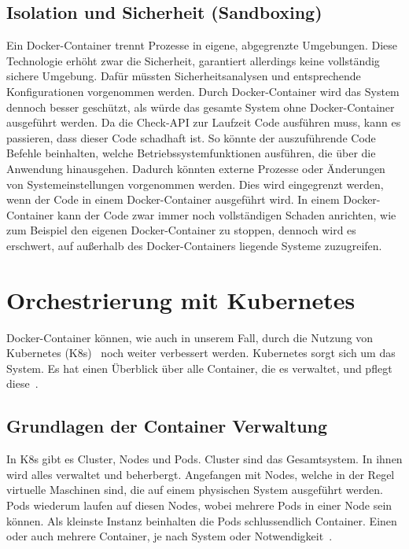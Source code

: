 \subsection{Isolation und Sicherheit (Sandboxing)}
	Ein Docker-Container trennt Prozesse in eigene, abgegrenzte Umgebungen. Diese Technologie erhöht zwar die Sicherheit, garantiert allerdings keine vollständig sichere Umgebung. Dafür müssten Sicherheitsanalysen und entsprechende Konfigurationen vorgenommen werden. Durch Docker-Container wird das System dennoch besser geschützt, als würde das gesamte System ohne Docker-Container ausgeführt werden. Da die Check-API zur Laufzeit Code ausführen muss, kann es passieren, dass dieser Code schadhaft ist. So könnte der auszuführende Code Befehle beinhalten, welche Betriebssystemfunktionen ausführen, die über die Anwendung hinausgehen. Dadurch könnten externe Prozesse oder Änderungen von Systemeinstellungen vorgenommen werden. Dies wird eingegrenzt werden, wenn der Code in einem Docker-Container ausgeführt wird. In einem Docker-Container kann der Code zwar immer noch vollständigen Schaden anrichten, wie zum Beispiel den eigenen Docker-Container zu stoppen, dennoch wird es erschwert, auf außerhalb des Docker-Containers liegende Systeme zuzugreifen.

\section{Orchestrierung mit Kubernetes}
Docker-Container können, wie auch in unserem Fall, durch die Nutzung von Kubernetes (K8s)~\cite{k8s} noch weiter verbessert werden. Kubernetes sorgt sich um das System. Es hat einen Überblick über alle Container, die es verwaltet, und pflegt diese~\cite{k8sOverview}.

\subsection{Grundlagen der Container Verwaltung}
In K8s gibt es Cluster, Nodes und Pods. Cluster sind das Gesamtsystem. In ihnen wird alles verwaltet und beherbergt. Angefangen mit Nodes, welche in der Regel virtuelle Maschinen sind, die auf einem physischen System ausgeführt werden. Pods wiederum laufen auf diesen Nodes, wobei mehrere Pods in einer Node sein können. Als kleinste Instanz beinhalten die Pods schlussendlich Container. Einen oder auch mehrere Container, je nach System oder Notwendigkeit~\cite{k8sCluster}.

